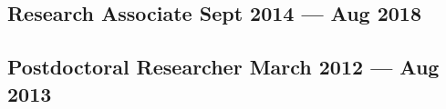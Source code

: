 \documentclass[letter,10pt]{article}
\begin{document}
\subsection{{Research Associate \hfill Sept 2014  --- Aug 2018}}
\vspace{1cm}

\subsection{{Postdoctoral Researcher \hfill March 2012 --- Aug 2013}}
\vspace{1cm}


\end{document}
